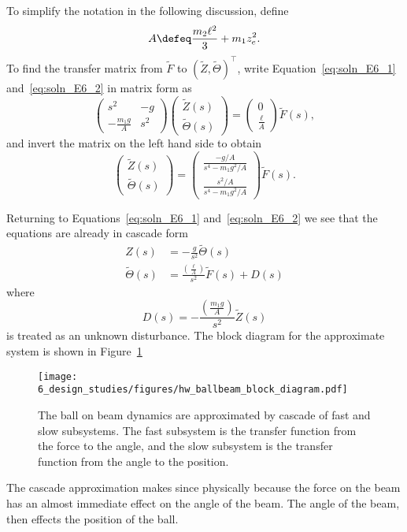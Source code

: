 To simplify the notation in the following discussion, define
\[
A \defeq \frac{m_2 \ell^2}{3} + m_1 z_e^2.
\]
To find the transfer matrix from $\tilde{F}$ to $(\tilde{Z}, \tilde{\Theta})^\top$, write Equation~\eqref{eq:soln_E6_1} and~\eqref{eq:soln_E6_2} in matrix form as
\[
\left(\begin{array}{c|c}
s^2 & -g \\\hline -\frac{m_1g}{A} & s^2 \end{array}\right)
\begin{pmatrix}\tilde{Z}(s) \\ \tilde{\Theta}(s) \end{pmatrix} 
= \begin{pmatrix} 0 \\ \frac{\ell}{A} \end{pmatrix} \tilde{F}(s),
\]
and invert the matrix on the left hand side to obtain
\[
\begin{pmatrix}\tilde{Z}(s) \\ \tilde{\Theta}(s) \end{pmatrix} 
= \begin{pmatrix} 
\frac{-g/A}{s^4-m_1g^2/A} \\ \frac{s^2/A}{s^4-m_1g^2/A}
\end{pmatrix} \tilde{F}(s).
\]

Returning to Equations~\eqref{eq:soln_E6_1} and~\eqref{eq:soln_E6_2} we see that the equations are already in cascade form
\begin{align*}
Z(s) &= -\frac{g}{s^2} \tilde{\Theta}(s) \\
\tilde{\Theta}(s) &= \frac{\left(\frac{\ell}{A}\right)}{s^2} \tilde{F}(s) + D(s)
\end{align*}
where
\[
D(s) = -\frac{\left(\frac{m_1 g}{A}\right)}{s^2} \tilde{Z}(s)
\]
is treated as an unknown disturbance.
The block diagram for the approximate system is shown in Figure~\ref{fig:hw_ballbeam_block_diagram}
\begin{figure}[htbp]
   \centering
   \texttt{[image: 6\_design\_studies/figures/hw\_ballbeam\_block\_diagram.pdf]}
   \caption{The ball on beam dynamics are approximated by cascade of fast and slow subsystems.  The fast subsystem is the transfer function from the force to the angle, and the slow subsystem is the transfer function from the angle to the position.}
   \label{fig:hw_ballbeam_block_diagram}
\end{figure}

The cascade approximation makes since physically because the force on the beam has an almost immediate effect on the angle of the beam.  
The angle of the beam, then effects the position of the ball.
